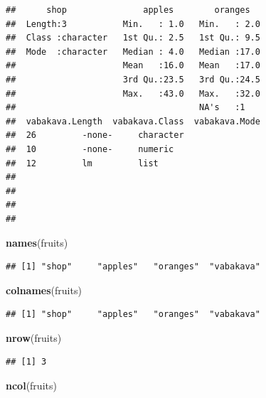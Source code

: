 \documentclass[]{book}
\newenvironment{Shaded}{\begin{snugshade}}{\end{snugshade}}
\newcommand{\KeywordTok}[1]{\textcolor[rgb]{0.13,0.29,0.53}{\textbf{#1}}}
\newcommand{\NormalTok}[1]{#1}
\begin{document}
\begin{verbatim}
##      shop               apples        oranges    
##  Length:3           Min.   : 1.0   Min.   : 2.0  
##  Class :character   1st Qu.: 2.5   1st Qu.: 9.5  
##  Mode  :character   Median : 4.0   Median :17.0  
##                     Mean   :16.0   Mean   :17.0  
##                     3rd Qu.:23.5   3rd Qu.:24.5  
##                     Max.   :43.0   Max.   :32.0  
##                                    NA's   :1     
##  vabakava.Length  vabakava.Class  vabakava.Mode
##  26         -none-     character               
##  10         -none-     numeric                 
##  12         lm         list                    
##                                                
##                                                
##                                                
## 
\end{verbatim}

\begin{Shaded}
\begin{Highlighting}[]
\KeywordTok{names}\NormalTok{(fruits)}
\end{Highlighting}
\end{Shaded}

\begin{verbatim}
## [1] "shop"     "apples"   "oranges"  "vabakava"
\end{verbatim}

\begin{Shaded}
\begin{Highlighting}[]
\KeywordTok{colnames}\NormalTok{(fruits)}
\end{Highlighting}
\end{Shaded}

\begin{verbatim}
## [1] "shop"     "apples"   "oranges"  "vabakava"
\end{verbatim}

\begin{Shaded}
\begin{Highlighting}[]
\KeywordTok{nrow}\NormalTok{(fruits)}
\end{Highlighting}
\end{Shaded}

\begin{verbatim}
## [1] 3
\end{verbatim}

\begin{Shaded}
\begin{Highlighting}[]
\KeywordTok{ncol}\NormalTok{(fruits)}
\end{Highlighting}
\end{Shaded}
\end{document}
